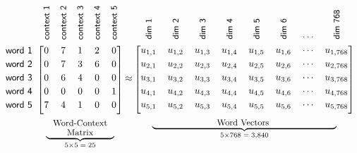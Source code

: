 \begin{figure}[ht!]
	\centering
	\[\arraycolsep=1.8pt\def\arraystretch{1.2}
	\begin{blockarray}{cccccc}
		\rot{\phantom{\textsf{\small{diiim 7689\,}}}} & \rot{\textsf{\small{context 1}}} & \rot{\textsf{\small{context 2}}} & \rot{\textsf{\small{context 3}}} & \rot{\textsf{\small{context 4}}} & \rot{\textsf{\small{context 5}}} \\
		\begin{block}{c[ccccc]}
			\textsf{word 1} & 0 & 7 & 1 & 2 & 0 \\
			\textsf{word 2} & 0 & 7 & 3 & 6 & 0 \\
			\textsf{word 3} & 0 & 6 & 4 & 0 & 0 \\
			\textsf{word 4} & 0 & 0 & 0 & 0 & 1 \\
			\textsf{word 5} & 7 & 4 & 1 & 0 & 0 \\[1.1ex]
		\end{block}
		& \BAmulticolumn{5}{c}{\small\text{Word-Context}} \\[-1.0ex]
		& \BAmulticolumn{5}{c}{\underbrace{\small{\text{\phantom{Word}Matrix\phantom{Word}}}}_{5 \times 5 \; = \; 25}} \\
	\end{blockarray}
	\approx
	\begin{blockarray}{ccccccccc}
		\rot{\textsf{\small{dim 1}}} & \rot{\textsf{\small{dim 2}}} & \rot{\textsf{\small{dim 3}}} & \rot{\textsf{\small{dim 4}}} & \rot{\textsf{\small{dim 5}}} & \rot{\textsf{\small{dim 6}}} & \cdots & \rot{\textsf{\small{dim 768}}} \\
		\begin{block}{[rrrrrrrrr]}
u_{1,1} & u_{1,2} & u_{1,3} & u_{1,4} & u_{1,5} & u_{1,6} & \cdots & u_{1,768} \\
u_{2,1} & u_{2,2} & u_{2,3} & u_{2,4} & u_{2,5} & u_{2,6} & \cdots & u_{2,768} \\
u_{3,1} & u_{3,2} & u_{3,3} & u_{3,4} & u_{3,5} & u_{3,6} & \cdots & u_{3,768} \\
u_{4,1} & u_{4,2} & u_{4,3} & u_{4,4} & u_{4,5} & u_{4,6} & \cdots & u_{4,768} \\
u_{5,1} & u_{5,2} & u_{5,3} & u_{5,4} & u_{5,5} & u_{5,6} & \cdots & u_{5,768} \\[1.1ex]
		\end{block}
		\BAmulticolumn{8}{c}{\underbrace{\small\text{\phantom{Word VectorsWo}Word Vectors\phantom{ Word VectorsWo}}}_{5 \times 768 \; = \; 3,840}} \\
	\end{blockarray}
\]
\end{figure}

